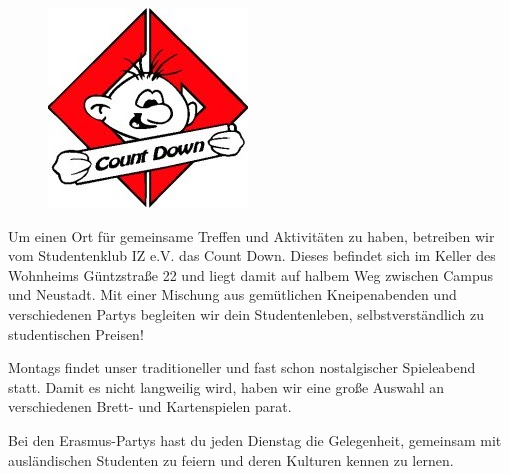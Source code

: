 
\begin{figure}%
  \vspace{-.5cm}
  \includegraphics[width=\linewidth]{img/countdown.jpg}
  \vspace{-1cm}
\end{figure}

Um einen Ort für gemeinsame Treffen und Aktivitäten zu haben, betreiben wir vom Studentenklub IZ e.V. das Count Down.
Dieses befindet sich im Keller des Wohnheims Güntzstraße 22 und liegt damit auf halbem Weg zwischen Campus und Neustadt.
Mit einer Mischung aus gemütlichen Kneipenabenden und verschiedenen Partys begleiten wir dein Studentenleben, selbstverständlich zu studentischen Preisen!

Montags findet unser traditioneller und fast schon nostalgischer Spieleabend statt.
Damit es nicht langweilig wird, haben wir eine große Auswahl an verschiedenen Brett- und Kartenspielen parat.

Bei den Erasmus-Partys hast du jeden Dienstag die Gelegenheit, gemeinsam mit ausländischen Studenten zu feiern und deren Kulturen kennen zu lernen.

